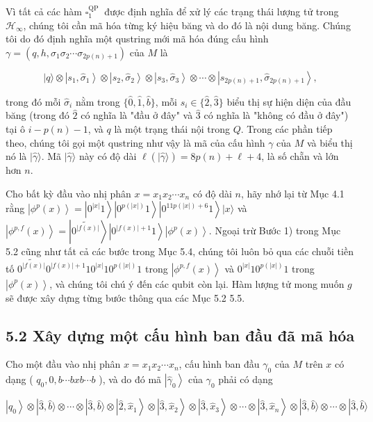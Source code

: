 \documentclass[10pt]{article}
\begin{document}
Vì tất cả các hàm $\square_{1}^{\text {QP }}$ được định nghĩa để xử lý các trạng thái lượng tử trong $\mathcal{H}_{\infty}$, chúng tôi cần mã hóa từng ký hiệu băng và do đó là nội dung băng. Chúng tôi do đó định nghĩa một qustring mới mã hóa đúng cấu hình $\gamma=\left(q, h, \sigma_{1} \sigma_{2} \cdots \sigma_{2 p(n)+1}\right)$ của $M$ là

$$
|q\rangle \otimes\left|s_{1}, \hat{\sigma}_{1}\right\rangle \otimes\left|s_{2}, \hat{\sigma}_{2}\right\rangle \otimes\left|s_{3}, \hat{\sigma}_{3}\right\rangle \otimes \cdots \otimes\left|s_{2 p(n)+1}, \hat{\sigma}_{2 p(n)+1}\right\rangle,
$$

trong đó mỗi $\hat{\sigma}_{i}$ nằm trong $\{\hat{0}, \hat{1}, \hat{b}\}$, mỗi $s_{i} \in\{\hat{2}, \hat{3}\}$ biểu thị sự hiện diện của đầu băng (trong đó $\hat{2}$ có nghĩa là "đầu ở đây" và $\hat{3}$ có nghĩa là "không có đầu ở đây") tại ô $i-p(n)-1$, và $q$ là một trạng thái nội trong $Q$. Trong các phần tiếp theo, chúng tôi gọi một qustring như vậy là mã của cấu hình $\gamma$ của $M$ và biểu thị nó là $|\hat{\gamma}\rangle$. Mã $|\hat{\gamma}\rangle$ này có độ dài $\ell(|\hat{\gamma}\rangle)=8 p(n)+\ell+4$, là số chẵn và lớn hơn $n$.

Cho bất kỳ đầu vào nhị phân $x=x_{1} x_{2} \cdots x_{n}$ có độ dài $n$, hãy nhớ lại từ Mục 4.1 rằng $\left|\phi^{p}(x)\right\rangle= \left|0^{|x|} 1\right\rangle\left|0^{p(|x|)} 1\right\rangle\left|0^{11 p(|x|)+6} 1\right\rangle|x\rangle$ và $\left|\phi^{p, f}(x)\right\rangle=\left|\widetilde{0^{|f(x)|}}\right\rangle\left|0^{|f(x)|+1} 1\right\rangle\left|\phi^{p}(x)\right\rangle$. Ngoại trừ Bước 1) trong Mục 5.2 cũng như tất cả các bước trong Mục 5.4, chúng tôi luôn bỏ qua các chuỗi tiền tố $\widetilde{0^{|f(x)|}} 0^{|f(x)|+1} 10^{|x|} 10^{p(|x|)} 1$ trong $\left|\phi^{p, f}(x)\right\rangle$ và $0^{|x|} 10^{p(|x|)} 1$ trong $\left|\phi^{p}(x)\right\rangle$, và chúng tôi chú ý đến các qubit còn lại. Hàm lượng tử mong muốn $g$ sẽ được xây dựng từng bước thông qua các Mục 5.2 5.5.

\subsection*{5.2 Xây dựng một cấu hình ban đầu đã mã hóa}
Cho một đầu vào nhị phân $x=x_{1} x_{2} \cdots x_{n}$, cấu hình ban đầu $\gamma_{0}$ của $M$ trên $x$ có dạng ( $q_{0}, 0, b \cdots b x b \cdots b$ ), và do đó mã $\left|\hat{\gamma}_{0}\right\rangle$ của $\gamma_{0}$ phải có dạng

$$
\left|q_{0}\right\rangle \otimes|\hat{3}, \hat{b}\rangle \otimes \cdots \otimes|\hat{3}, \hat{b}\rangle \otimes\left|\hat{2}, \hat{x}_{1}\right\rangle \otimes\left|\hat{3}, \hat{x}_{2}\right\rangle \otimes\left|\hat{3}, \hat{x}_{3}\right\rangle \otimes \cdots \otimes\left|\hat{3}, \hat{x}_{n}\right\rangle \otimes|\hat{3}, \hat{b}\rangle \otimes \cdots \otimes|\hat{3}, \hat{b}\rangle
$$
\end{document}
